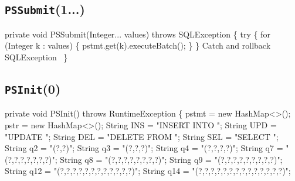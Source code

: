 \documentclass{article}
\def\nwendcode{\endtrivlist \endgroup}
\theoremstyle{definition}
\begin{document}
\subsection{{\tt{}\protect{}PSSubmit}(1...)}
\nwenddocs{}\endmoddef{}
private void PSSubmit(Integer... values) throws SQLException \{
  try \{
    for (Integer k : values) \{
      pstmt.get(k).executeBatch();
    \}
  \}
  \LA{}Catch and rollback \code{}SQLException\edoc{}~{\nwtagstyle{}}\RA{}
\}
\eatline
{}\nwendcode{}\subsection{{\tt{}\protect{}PSInit}(0)}
\label{sec:initialize-statements}
\nwenddocs{}\endmoddef{}
private void PSInit() throws RuntimeException \{
  pstmt = new HashMap<>();
  pstr = new HashMap<>();
  String INS = "INSERT INTO ";
  String UPD = "UPDATE ";
  String DEL = "DELETE FROM ";
  String SEL = "SELECT ";
  String q2  = "(?,?)";
  String q3  = "(?,?,?)";
  String q4  = "(?,?,?,?)";
  String q7  = "(?,?,?,?,?,?,?)";
  String q8  = "(?,?,?,?,?,?,?,?)";
  String q9  = "(?,?,?,?,?,?,?,?,?)";
  String q12 = "(?,?,?,?,?,?,?,?,?,?,?,?)";
  String q14 = "(?,?,?,?,?,?,?,?,?,?,?,?,?,?)";
\end{document}
